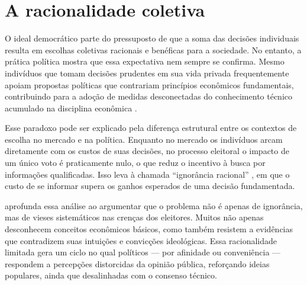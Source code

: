
\section{A racionalidade coletiva} %


O ideal democrático parte do pressuposto de que a soma das decisões individuais resulta em escolhas coletivas racionais e benéficas para a sociedade. No entanto, a prática política mostra que essa expectativa nem sempre se confirma. Mesmo indivíduos que tomam decisões prudentes em sua vida privada frequentemente apoiam propostas políticas que contrariam princípios econômicos fundamentais, contribuindo para a adoção de medidas desconectadas do conhecimento técnico acumulado na disciplina econômica \cite{downs1957economic,The_Myth_of_the_Rational_Voter}.

Esse paradoxo pode ser explicado pela diferença estrutural entre os contextos de escolha no mercado e na política. Enquanto no mercado os indivíduos arcam diretamente com os custos de suas decisões, no processo eleitoral o impacto de um único voto é praticamente nulo, o que reduz o incentivo à busca por informações qualificadas. Isso leva à chamada “ignorância racional” \cite{downs1957economic}, em que o custo de se informar supera os ganhos esperados de uma decisão fundamentada.

 aprofunda essa análise ao argumentar que o problema não é apenas de ignorância, mas de vieses sistemáticos nas crenças dos eleitores. Muitos não apenas desconhecem conceitos econômicos básicos, como também resistem a evidências que contradizem suas intuições e convicções ideológicas. Essa racionalidade limitada gera um ciclo no qual políticos — por afinidade ou conveniência — respondem a percepções distorcidas da opinião pública, reforçando ideias populares, ainda que desalinhadas com o consenso técnico.

